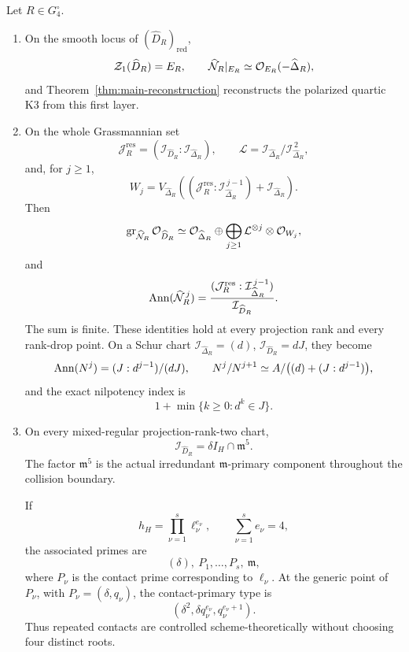 \begin{theorem}
\label{thm:main-depth}
Let \(R\in G_4^\circ\).

\begin{enumerate}
\item On the smooth locus of
\((\widehat D_R)_{\mathrm{red}}\),
\[
 \mathcal Z_1(\widehat D_R)=E_R,\qquad
 \widehat{\mathcal N}_R|_{E_R}
 \simeq\mathcal O_{E_R}(-\widehat\Delta_R),
\]
and Theorem~\ref{thm:main-reconstruction} reconstructs the polarized
quartic K3 from this first layer.

\item On the whole Grassmannian set
\[
 \mathcal J_R^{\mathrm{res}}
 =
 (\mathcal I_{\widehat D_R}:
  \mathcal I_{\widehat\Delta_R}),
 \qquad
 \mathcal L=
 \mathcal I_{\widehat\Delta_R}/
 \mathcal I_{\widehat\Delta_R}^{\,2},
\]
and, for \(j\ge1\),
\[
 W_j=
 V_{\widehat\Delta_R}\!\left(
 (\mathcal J_R^{\mathrm{res}}:
  \mathcal I_{\widehat\Delta_R}^{\,j-1})
 +\mathcal I_{\widehat\Delta_R}\right).
\]
Then
\begin{equation}\label{eq:main-global-gr}
 \operatorname{gr}_{\widehat{\mathcal N}_R}\mathcal O_{\widehat D_R}
 \simeq
 \mathcal O_{\widehat\Delta_R}
 \oplus
 \bigoplus_{j\ge1}
 \mathcal L^{\otimes j}\otimes\mathcal O_{W_j},
\end{equation}
and
\begin{equation}\label{eq:main-global-ann}
 \operatorname{Ann}(\widehat{\mathcal N}_R^{\,j})
 =
 \frac{
 (\mathcal J_R^{\mathrm{res}}:
  \mathcal I_{\widehat\Delta_R}^{\,j-1})
 }{\mathcal I_{\widehat D_R}}.
\end{equation}
The sum is finite.  These identities hold at every projection rank
and every rank-drop point.  On a Schur chart
\(\mathcal I_{\widehat\Delta_R}=(d)\),
\(\mathcal I_{\widehat D_R}=dJ\), they become
\[
 \operatorname{Ann}(N^j)=(J:d^{j-1})/(dJ),\qquad
 N^j/N^{j+1}
 \simeq
 A/\bigl((d)+(J:d^{j-1})\bigr),
\]
and the exact nilpotency index is
\[
 1+\min\{k\ge0:d^k\in J\}.
\]

\item On every mixed-regular projection-rank-two chart,
\begin{equation}\label{eq:main-contact-factor}
 \mathcal I_{\widehat D_R}
 =
 \delta I_H\cap\mathfrak m^5.
\end{equation}
The factor \(\mathfrak m^5\) is the actual irredundant
\(\mathfrak m\)-primary component throughout the collision boundary.

If
\[
 h_H=\prod_{\nu=1}^s\ell_\nu^{e_\nu},
 \qquad\sum_{\nu=1}^se_\nu=4,
\]
the associated primes are
\[
 (\delta),\ P_1,\ldots,P_s,\ \mathfrak m,
\]
where \(P_\nu\) is the contact prime corresponding to \(\ell_\nu\).
At the generic point of \(P_\nu\), with
\(P_\nu=(\delta,q_\nu)\), the contact-primary type is
\begin{equation}\label{eq:main-collision-primary}
 (\delta^2,\delta q_\nu^{e_\nu},q_\nu^{e_\nu+1}).
\end{equation}
Thus repeated contacts are controlled scheme-theoretically without
choosing four distinct roots.


\end{enumerate}
\end{theorem}
